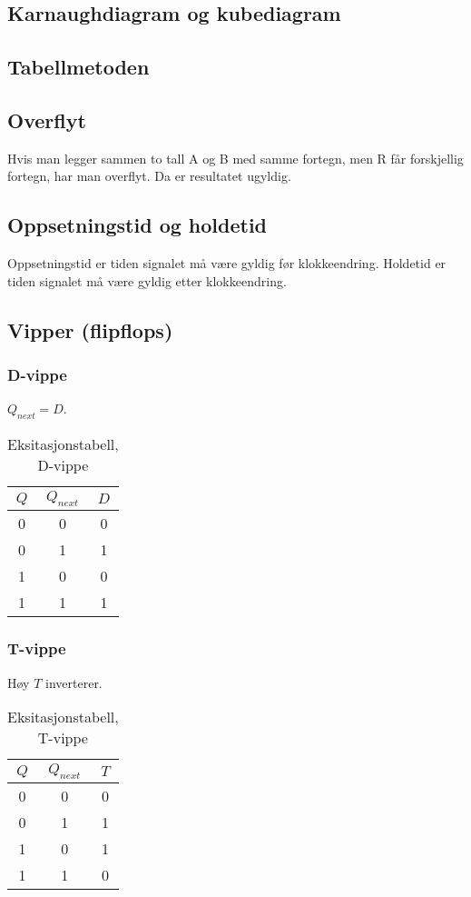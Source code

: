 \documentclass{article}
\begin{document}
\subsection{Karnaughdiagram og kubediagram}

\subsection{Tabellmetoden}

\subsection{Overflyt}
Hvis man legger sammen to tall A og B med samme fortegn, men R får forskjellig fortegn, har man overflyt. Da er resultatet ugyldig.

\subsection{Oppsetningstid og holdetid}
Oppsetningstid er tiden signalet må være gyldig før klokkeendring. Holdetid er tiden signalet må være gyldig etter klokkeendring.

\subsection{Vipper (flipflops)}

\subsubsection{D-vippe}
$Q_{next} = D$.
\begin{table}[h]
    \centering
    \begin{tabular}{c|c|c}
    $Q$ & $Q_{next}$ & $D$ \\
    \hline
    0 & 0 & 0\\
    0 & 1 & 1\\
    1 & 0 & 0\\
    1 & 1 & 1
    \end{tabular}
    \caption{Eksitasjonstabell, D-vippe}
\end{table}

\subsubsection{T-vippe}
Høy $T$ inverterer.
\begin{table}[h]
    \centering
    \begin{tabular}{c|c|c}
    $Q$ & $Q_{next}$ & $T$ \\
    \hline
    0 & 0 & 0\\
    0 & 1 & 1\\
    1 & 0 & 1\\
    1 & 1 & 0
    \end{tabular}
    \caption{Eksitasjonstabell, T-vippe}
\end{table}
\end{document}
